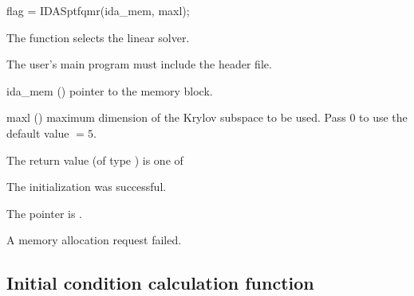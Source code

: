 {}
{
  flag = IDASptfqmr(ida\_mem, maxl);
}
{
  The function  selects the {\idasptfqmr} linear solver. 

  The user's main program must include the  header file.
}
{
  \begin{args}
  \item[ida\_mem] ()
    pointer to the {\ida} memory block.
  \item[maxl] ()
    maximum dimension of the Krylov subspace to be used. Pass $0$ to use the 
    default value $=5$.
  \end{args}
}
{
  The return value  (of type ) is one of
  \begin{args}
  \item[\Id{IDASPILS\_SUCCESS}] 
    The {\idasptfqmr} initialization was successful.
  \item[\Id{IDASPILS\_MEM\_NULL}]
    The  pointer is .
  \item[\Id{IDASPILS\_MEM\_FAIL}]
    A memory allocation request failed.
  \end{args}
}
{}


\subsection{Initial condition calculation function}\label{ss:idacalcic}

